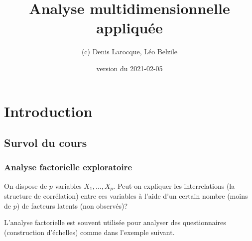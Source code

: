 \documentclass[
  11pt,
  letterpaper,
]{book}
\title{Analyse multidimensionnelle appliquée}
\author{(c) Denis Larocque, Léo Belzile}
\date{version du 2021-02-05}
\theoremstyle{definition}
\theoremstyle{definition}
\theoremstyle{definition}
\theoremstyle{remark}
\begin{document}
\maketitle

{
\setcounter{tocdepth}{1}
\tableofcontents
}
\hypertarget{introduction}{%
\chapter{Introduction}\label{introduction}}

\newcommand{\bs}[1]{\boldsymbol{#1}}
\newcommand{\eps}{\varepsilon}
\newcommand{\Rlang}{\textsf{R}}
\newcommand{\SAS}{\textsf{SAS}}
\newcommand{\Sp}{\mathscr{S}}
\renewcommand{\P}[1]{{\mathsf P}\left(#1\right)}
\newcommand{\E}[1]{{\mathsf E}\left(#1\right)}
\newcommand{\Va}[1]{{\mathsf{Var}}\left(#1\right)}
\newcommand{\Cor}[1]{{\mathsf{Cor}}\left(#1\right)}
\newcommand{\I}[1]{{\mathbf 1}_{#1}}
\newcommand{\expit}{\mathrm{expit}}
\newcommand{\logit}{\mathrm{logit}}
\newcommand{\code}[1]{\texttt{#1}}
\newcommand{\Hy}{\mathcal{H}}
\renewcommand{\d}{\mathrm{d}}

\hypertarget{survol-du-cours}{%
\section{Survol du cours}\label{survol-du-cours}}

\hypertarget{analyse-factorielle-exploratoire}{%
\subsection{Analyse factorielle exploratoire}\label{analyse-factorielle-exploratoire}}

On dispose de \(p\) variables \(X_1, \ldots, X_p\). Peut-on expliquer les interrelations (la structure de corrélation) entre ces variables à l'aide d'un certain nombre (moins de \(p\)) de facteurs latents (non observés)?

L'analyse factorielle est souvent utilisée pour analyser des questionnaires (construction d'échelles) comme dans l'exemple suivant.
\end{document}
